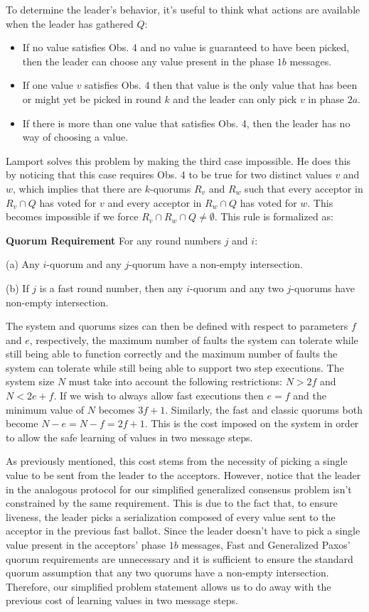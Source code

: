 To determine the leader's behavior, it's useful to think what actions are available when the leader has gathered $Q$:
\begin{itemize}
	\item If no value satisfies Obs. 4 and no value is guaranteed to have been picked, then the leader can choose any value present in the phase $1b$ messages.
	\item If one value $v$ satisfies Obs. 4 then that value is the only value that has been or might yet be picked in round $k$ and the leader can only pick $v$ in phase $2a$.
	\item If there is more than one value that satisfies Obs. 4, then the leader has no way of choosing a value.
\end{itemize} 

Lamport solves this problem by making the third case impossible. He does this by noticing that this case requires Obs. 4 to be true for two distinct values $v$ and $w$, which implies that there are $k$-quorums $R_v$ and $R_w$ such that every acceptor in $R_v \cap Q$ has voted for $v$ and every acceptor in $R_w \cap Q$ has voted for $w$. This becomes impossible if we force $R_v \cap R_w \cap Q \neq \emptyset$. This rule is formalized as:

\begin{displayquote}
	\textbf{Quorum Requirement} For any round numbers $j$ and $i$:\par
	(a) Any $i$-quorum and any $j$-quorum have a non-empty intersection.\par
	(b) If $j$ is a fast round number, then any $i$-quorum and any two $j$-quorums have non-empty intersection. 	
\end{displayquote}

The system and quorums sizes can then be defined with respect to parameters $f$ and $e$, respectively, the maximum number of faults the system can tolerate while still being able to function correctly and the maximum number of faults the system can tolerate while still being able to support two step executions. The system size $N$ must take into account the following restrictions: $N > 2f$ and $N < 2e+f$. If we wish to always allow fast executions then $e=f$ and the minimum value of $N$ becomes $3f+1$. Similarly, the fast and classic quorums both become $N-e=N-f= 2f+1$. This is the cost imposed on the system in order to allow the safe learning of values in two message steps. \par
As previously mentioned, this cost stems from the necessity of picking a single value to be sent from the leader to the acceptors. However, notice that the leader in the analogous protocol for our simplified generalized consensus problem isn't constrained by the same requirement. This is due to the fact that, to ensure liveness, the leader picks a serialization composed of every value sent to the acceptor in the previous fast ballot. Since the leader doesn't have to pick a single value present in the acceptors' phase $1b$ messages, Fast and Generalized Paxos' quorum requirements are unnecessary and it is sufficient to ensure the standard quorum assumption that any two quorums have a non-empty intersection. Therefore, our simplified problem statement allows us to do away with the previous cost of learning values in two message steps.
\fi